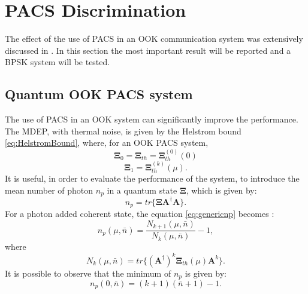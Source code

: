 \section{PACS Discrimination}
    The effect of the use of PACS in an OOK communication system was extensively discussed in
    \cite{PACSDisc}. In this section the most important result will be reported and a BPSK
    system will be tested.

    \subsection{Quantum OOK PACS system}
    The use of PACS in an OOK system can significantly improve the performance. The MDEP, with
    thermal noise, is given by the Helstrom bound \ref{eq:HelstromBound}, where, for an OOK PACS
    system,
    \begin{equation}
        \pmb{\Xi}_0 =  \pmb{\Xi}_{th} = \pmb{\Xi}_{th}^{(0)}(0)
    \end{equation}
    \begin{equation*}
        \pmb{\Xi}_1 =  \pmb{\Xi}_{th}^{(k)}(\mu).
    \end{equation*}
    It is useful, in order to evaluate the performance of the system, to introduce the mean number
    of photon $n_p$ in a quantum state $\pmb{\Xi}$, which is given by:
    \begin{equation}
        n_p = tr\{\pmb{\Xi}\pmb{A}^\dagger\pmb{A}\}.
        \label{eq:genericnp}
    \end{equation}
    For a photon added coherent state, the equation \ref{eq:genericnp} becomes \cite{PACSDisc}:
    \begin{equation}
        n_p(\mu,\bar{n}) = \frac{N_{k+1}(\mu,\bar{n})}{N_k(\mu,\bar{n})}-1,
        \label{eq:np}
    \end{equation}
    where
    \begin{equation}
        N_k(\mu,\bar{n}) = tr\{(\pmb{A}^\dagger)^k \pmb{\Xi}_{th}(\mu) \pmb{A}^k\}.
    \end{equation}
    It is possible to observe that the minimum of $n_p$ is given by:
    \begin{equation}
        n_p(0,\bar{n}) = (k+1)(\bar{n}+1)-1.
        \label{eq:min_np}
    \end{equation}

